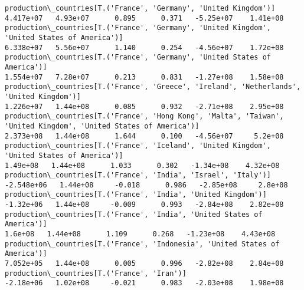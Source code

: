 \documentclass[11pt]{article}
\begin{document}
\begin{Verbatim}[commandchars=\\\{\}]
production\_countries[T.('France', 'Germany', 'United Kingdom')]                                                                                                                        4.417e+07   4.93e+07      0.895      0.371   -5.25e+07    1.41e+08
production\_countries[T.('France', 'Germany', 'United Kingdom', 'United States of America')]                                                                                            6.338e+07   5.56e+07      1.140      0.254   -4.56e+07    1.72e+08
production\_countries[T.('France', 'Germany', 'United States of America')]                                                                                                              1.554e+07   7.28e+07      0.213      0.831   -1.27e+08    1.58e+08
production\_countries[T.('France', 'Greece', 'Ireland', 'Netherlands', 'United Kingdom')]                                                                                               1.226e+07   1.44e+08      0.085      0.932   -2.71e+08    2.95e+08
production\_countries[T.('France', 'Hong Kong', 'Malta', 'Taiwan', 'United Kingdom', 'United States of America')]                                                                       2.373e+08   1.44e+08      1.644      0.100   -4.56e+07     5.2e+08
production\_countries[T.('France', 'Iceland', 'United Kingdom', 'United States of America')]                                                                                             1.49e+08   1.44e+08      1.033      0.302   -1.34e+08    4.32e+08
production\_countries[T.('France', 'India', 'Israel', 'Italy')]                                                                                                                        -2.548e+06   1.44e+08     -0.018      0.986   -2.85e+08     2.8e+08
production\_countries[T.('France', 'India', 'United Kingdom')]                                                                                                                          -1.32e+06   1.44e+08     -0.009      0.993   -2.84e+08    2.82e+08
production\_countries[T.('France', 'India', 'United States of America')]                                                                                                                  1.6e+08   1.44e+08      1.109      0.268   -1.23e+08    4.43e+08
production\_countries[T.('France', 'Indonesia', 'United States of America')]                                                                                                            7.052e+05   1.44e+08      0.005      0.996   -2.82e+08    2.84e+08
production\_countries[T.('France', 'Iran')]                                                                                                                                             -2.18e+06   1.02e+08     -0.021      0.983   -2.03e+08    1.98e+08

\end{Verbatim}
\end{document}
